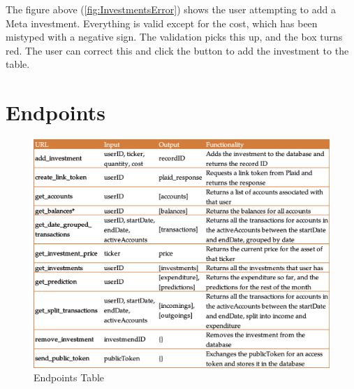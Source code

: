 The figure above (\ref{fig:InvestmentsError}) shows the user attempting to add a Meta investment. Everything is valid except for the cost, which has been mistyped with a negative sign. The validation picks this up, and the box turns red. The user can correct this and click the button to add the investment to the table.

\section{Endpoints}
\begin{figure}
	\centering
	\includegraphics[width=\textwidth]{images/endpoints.png}
	\caption{Endpoints Table}
	\label{fig:Endpoints}
\end{figure}
